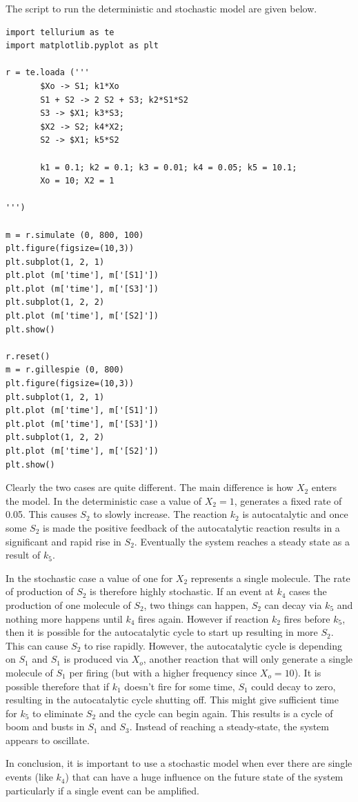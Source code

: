 \documentclass[12pt]{article}
\begin{document}
\cprotEnv\begin{solution}
The script to run the deterministic and stochastic model are given below.
\begin{verbatim}
import tellurium as te
import matplotlib.pyplot as plt

r = te.loada ('''
       $Xo -> S1; k1*Xo
       S1 + S2 -> 2 S2 + S3; k2*S1*S2
       S3 -> $X1; k3*S3;
       $X2 -> S2; k4*X2;
       S2 -> $X1; k5*S2

       k1 = 0.1; k2 = 0.1; k3 = 0.01; k4 = 0.05; k5 = 10.1;
       Xo = 10; X2 = 1

''')

m = r.simulate (0, 800, 100)
plt.figure(figsize=(10,3))
plt.subplot(1, 2, 1)
plt.plot (m['time'], m['[S1]'])
plt.plot (m['time'], m['[S3]'])
plt.subplot(1, 2, 2)
plt.plot (m['time'], m['[S2]'])
plt.show()

r.reset()
m = r.gillespie (0, 800)
plt.figure(figsize=(10,3))
plt.subplot(1, 2, 1)
plt.plot (m['time'], m['[S1]'])
plt.plot (m['time'], m['[S3]'])
plt.subplot(1, 2, 2)
plt.plot (m['time'], m['[S2]'])
plt.show()
\end{verbatim}
Clearly the two cases are quite different. The main difference is how $X_2$ enters the model. In the deterministic case a value of $X_2 = 1$, generates a fixed rate of 0.05. This causes $S_2$ to slowly increase. The reaction $k_2$ is autocatalytic and once some $S_2$ is made the positive feedback of the autocatalytic reaction results in a significant and rapid rise in $S_2$. Eventually the system reaches a steady state as a result of $k_5$.

In the stochastic case a value of one for $X_2$ represents a single molecule. The rate of production of $S_2$ is therefore highly stochastic. If an event at $k_4$ cases the production of one molecule of $S_2$, two things can happen, $S_2$ can decay via $k_5$ and nothing more happens until $k_4$ fires again. However if reaction $k_2$ fires before $k_5$, then it is possible for the autocatalytic cycle to start up resulting in more $S_2$. This can cause $S_2$ to rise rapidly. However, the autocatalytic cycle is depending on $S_1$ and $S_1$ is produced via $X_o$, another reaction that will only generate a single molecule of $S_1$ per firing (but with a higher frequency since $X_o = 10$). It is possible therefore that if $k_1$ doesn't fire for some time, $S_1$ could decay to zero, resulting in the autocatalytic cycle shutting off. This might give sufficient time for $k_5$ to eliminate $S_2$ and the cycle can begin again. This results is a cycle of boom and busts in $S_1$ and $S_3$. Instead of reaching a steady-state, the system appears to oscillate.

In conclusion, it is important to use a stochastic model when ever there are single events (like $k_4$) that can have a huge influence on the future state of the system particularly if a single event can be amplified.
\end{solution}
\end{document}
